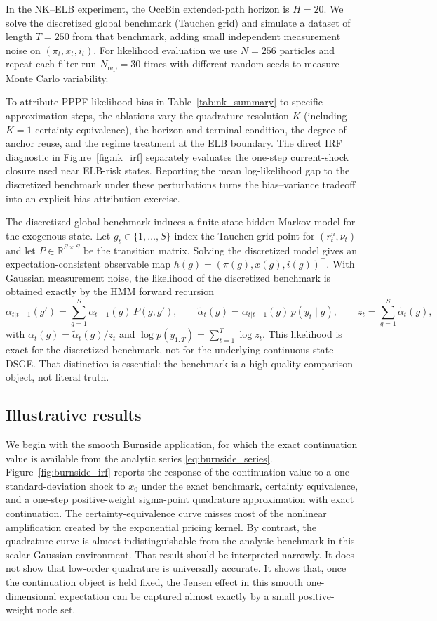 \documentclass[11pt]{article}
\theoremstyle{remark}
\newcommand{\R}{\mathbb{R}}
\begin{document}
In the NK--ELB experiment, the OccBin extended-path horizon is $H=20$.
We solve the discretized global benchmark (Tauchen grid) and simulate a dataset of length $T=250$ from that benchmark, adding small independent measurement noise on $(\pi_t,x_t,i_t)$.
For likelihood evaluation we use $N=256$ particles and repeat each filter run $N_{\mathrm{rep}}=30$ times with different random seeds to measure Monte Carlo variability.

To attribute PPPF likelihood bias in Table~\ref{tab:nk_summary} to specific approximation steps, the ablations vary the quadrature resolution $K$ (including $K=1$ certainty equivalence), the horizon and terminal condition, the degree of anchor reuse, and the regime treatment at the ELB boundary.
The direct IRF diagnostic in Figure~\ref{fig:nk_irf} separately evaluates the one-step current-shock closure used near ELB-risk states.
Reporting the mean log-likelihood gap to the discretized benchmark under these perturbations turns the bias--variance tradeoff into an explicit bias attribution exercise.

The discretized global benchmark induces a finite-state hidden Markov model for the exogenous state.
Let $g_t\in\{1,\ldots,S\}$ index the Tauchen grid point for $(r_t^n,\nu_t)$ and let $P\in\R^{S\times S}$ be the transition matrix.
Solving the discretized model gives an expectation-consistent observable map $h(g)=(\pi(g),x(g),i(g))^\top$.
With Gaussian measurement noise, the likelihood of the discretized benchmark is obtained exactly by the HMM forward recursion
\[
\alpha_{t|t-1}(g')=\sum_{g=1}^S \alpha_{t-1}(g)\,P(g,g'),\qquad
\tilde \alpha_t(g)=\alpha_{t|t-1}(g)\,p(y_t\mid g),\qquad
z_t=\sum_{g=1}^S \tilde \alpha_t(g),
\]
with $\alpha_t(g)=\tilde \alpha_t(g)/z_t$ and $\log p(y_{1:T})=\sum_{t=1}^T \log z_t$.
This likelihood is exact for the discretized benchmark, not for the underlying continuous-state DSGE.
That distinction is essential: the benchmark is a high-quality comparison object, not literal truth.

\subsection{Illustrative results}

We begin with the smooth Burnside application, for which the exact continuation value is available from the analytic series \eqref{eq:burnside_series}.
Figure~\ref{fig:burnside_irf} reports the response of the continuation value to a one-standard-deviation shock to $x_0$ under the exact benchmark, certainty equivalence, and a one-step positive-weight sigma-point quadrature approximation with exact continuation.
The certainty-equivalence curve misses most of the nonlinear amplification created by the exponential pricing kernel.
By contrast, the quadrature curve is almost indistinguishable from the analytic benchmark in this scalar Gaussian environment.
That result should be interpreted narrowly.
It does not show that low-order quadrature is universally accurate.
It shows that, once the continuation object is held fixed, the Jensen effect in this smooth one-dimensional expectation can be captured almost exactly by a small positive-weight node set.
\end{document}
